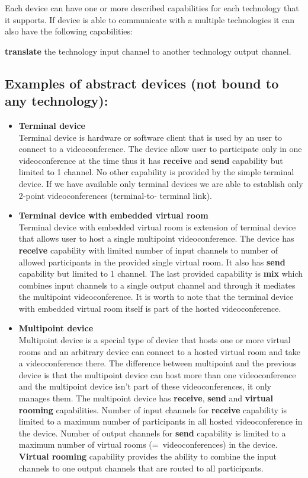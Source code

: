 \documentclass[a4paper]{report}
\begin{document}
Each device can have one or more described capabilities for each technology
that it supports.
If device is able to communicate with a multiple technologies it can also have the following capabilities:
\begin{compactitem}
\item \textbf{translate} the technology input channel to another technology output 
  channel.
\end{compactitem}


\subsection*{Examples of abstract devices (not bound to any technology):}
\begin{itemize}
\item \textbf{Terminal device} \\
  Terminal device is hardware or software client that is used by an user to 
  connect to a videoconference. The device allow user to participate only in
  one videoconference at the time thus it has \textbf{receive} and 
  \textbf{send} capability but limited to 1 channel. No other capability is 
  provided by the simple terminal device. If we have available only terminal 
  devices we are able to establish only 2-point videoconferences (terminal-to-
  terminal link).

\item \textbf{Terminal device with embedded virtual room} \\
  Terminal device with embedded virtual room is extension of terminal device 
  that allows user to host a single multipoint videoconference. The device has 
  \textbf{receive} capability with limited number of input channels to number 
  of allowed participants in the provided single virtual room. It also has 
  \textbf{send} capability but limited to 1 channel. The last provided 
  capability is \textbf{mix} which combines input channels to a single output 
  channel and through it mediates the multipoint videoconference. It is worth 
  to note that the terminal device with embedded virtual room itself is part of 
  the hosted videoconference.

\item \textbf{Multipoint device} \\
  Multipoint device is a special type of device that hosts one or more virtual 
  rooms and an arbitrary device can connect to a hosted virtual room and take 
  a videoconference there. The difference between multipoint and the previous 
  device is that the multipoint device can host more than one videoconference 
  and the multipoint device isn't part of these videoconferences, it only 
  manages them. The multipoint device has \textbf{receive}, \textbf{send} and 
  \textbf{virtual rooming} capabilities. Number of input channels for 
  \textbf{receive} capability is limited to a maximum number of participants 
  in all hosted videoconference in the device. Number of output channels for 
  \textbf{send} capability is limited to a maximum number of virtual rooms 
  (=~videoconferences) in the device. \textbf{Virtual rooming} capability 
  provides the ability to combine the input channels to one output channels 
  that are routed to all participants.


\end{itemize}
\end{document}
